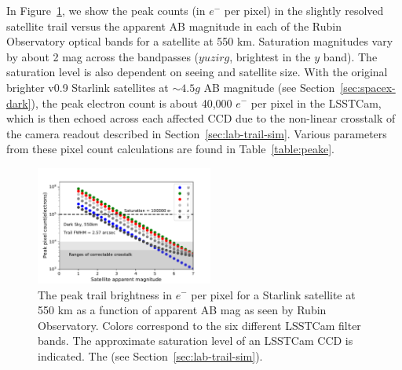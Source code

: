 \documentclass[twocolumn,trackchanges]{aastex63}
\begin{document}
In Figure~\ref{fig:peakesim550}, we show the peak counts (in $e^-$ per pixel) in the slightly resolved satellite trail versus the apparent AB magnitude in each of the Rubin Observatory optical bands for a satellite at 550 km. Saturation magnitudes vary by about 2 mag across the bandpasses ($yuzirg$, brightest in the $y$ band). The saturation level is also dependent on seeing and satellite size. 
With the original brighter v0.9 Starlink satellites at $\sim4.5 g$ AB magnitude (see Section~\ref{sec:spacex-dark}), the peak electron count is about 40,000 $e^-$ per pixel in the LSSTCam, which is then echoed across each affected CCD due to the non-linear crosstalk of the camera readout described in  Section~\ref{sec:lab-trail-sim}.  
Various parameters from these pixel count calculations are found in Table~\ref{table:peake}.
\begin{figure}[ht]
\includegraphics[width=0.52\textwidth]{Peak_count_by_band_550km_darkSky.pdf}
\caption{The peak trail brightness in $e^-$ per pixel for a Starlink satellite at 550 km as a function of apparent AB mag as seen by Rubin Observatory. Colors correspond to the six different LSSTCam filter bands. The approximate saturation level of an LSSTCam CCD is indicated. The  (see Section~\ref{sec:lab-trail-sim}). \label{fig:peakesim550}}
\end{figure}
\end{document}
